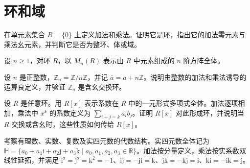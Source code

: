 \renewcommand{\thesection}{\arabic{section}}\renewcommand{\theHsection}{chapter.\arabic{section}}\setcounter{section}{1}\section{环和域}
\noindent\begin{minipage}{\textwidth}
在单元素集合 $R=\{0\}$ 上定义加法和乘法。证明它是环，指出它的加法零元素与乘法幺元素，并判断它是否为整环、体或域。
\end{minipage}\par\vfill
\noindent\begin{minipage}{\textwidth}
设 $n\ge 1$，对环 $R$，以 $M_n(R)$ 表示由 $R$ 中元素组成的 $n$ 阶方阵全体。
\end{minipage}\par\vfill
\noindent\begin{minipage}{\textwidth}
设 $n$ 是正整数，$\mathbb{Z}_n=\mathbb{Z}/n\mathbb{Z}$，并记 $\overline{a}=a+n\mathbb{Z}$。说明由整数的加法和乘法诱导的运算良定义，并验证 $\mathbb{Z}_n$ 是含幺交换环。
\end{minipage}\par\vfill
\newpage
\noindent\begin{minipage}{\textwidth}
设 $R$ 是任意环。用 $R[x]$ 表示系数在 $R$ 中的一元形式多项式全体。加法逐项相加，乘法中 $x^k$ 的系数定义为 $\sum_{i+j=k}a_i b_j$。证明 $R[x]$ 对此形成环，并说明当 $R$ 交换或含幺时，这些性质如何传给 $R[x]$。
\end{minipage}\par\vfill
\noindent\begin{minipage}{\textwidth}
考察有理数、实数、复数及实四元数的代数结构。实四元数全体记为 $\mathbb{H}=\{a_0+a_1\mathrm{i}+a_2\mathrm{j}+a_3\mathrm{k}\mid a_0,a_1,a_2,a_3\in\mathbb{R}\}$。加法按分量定义，乘法按实系数双线性延拓，并满足 $\mathrm{i}^2=\mathrm{j}^2=\mathrm{k}^2=-1$、$\mathrm{ij}=-\mathrm{ji}=\mathrm{k}$、$\mathrm{jk}=-\mathrm{kj}=\mathrm{i}$、$\mathrm{ki}=-\mathrm{ik}=\mathrm{j}$。
\end{minipage}\par\vfill
